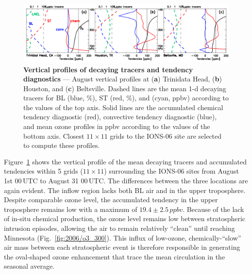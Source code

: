 	\begin{figure}[t!]
		\centering
		 \label{fig:2006/tendency_vertical} 
		\includegraphics[width=1.0\textwidth]{tendency/vertical.png}
		\caption[Vertical profiles of decaying tracers and tendency diagnostics]{\textbf{Vertical profiles of decaying tracers
		and tendency diagnostics} --- August vertical profiles at ({\bf a}) Trinidata Head, ({\bf b}) Houston,
		and ({\bf c}) Beltsville. Dashed lines are the mean 1-d decaying tracers for BL (blue, \unit{\%}), ST (red, \unit{\%}), and {\lnox} (cyan,
		\unit{ppbv}) according to the values of the top axis. Solid lines are the accumulated chemical tendency diagnostic (red), convective
		tendency diagnostic (blue), and mean ozone profiles in \unit{ppbv} according to the values of the bottom axis. Closest $11\times11$
		grids to the IONS-06 site are selected to compute these profiles.}\vspace{-.3in}
	\end{figure}

Figure~\ref{fig:2006/tendency_vertical} shows the vertical profile of the mean decaying tracers and accumulated
tendencies within 5 grids ($11\times11$) surrounding the
IONS-06 sites from August 1st 00\,\unit{UTC} to August 31 00\,\unit{UTC}. The differences between the three locations are again evident. The inflow
region lacks both BL air and {\lnox} in the upper troposphere. Despite comparable ozone level, the accumulated tendency in the upper
troposphere remains low with a maximum of $19.4\pm2.5\,\unit{ppbv}$. Because of the lack of in-situ chemical production, the ozone level remains
low between stratospheric intrusion episodes, allowing the air to remain relatively ``clean'' until reaching Minnesota (Fig.~\ref{fig:2006/o3_300}).
This influx of low-ozone, chemically-``slow'' air mass between each stratospheric event is therefore responsible in generating the oval-shaped
ozone enhancement that trace the mean circulation in the seasonal average.

